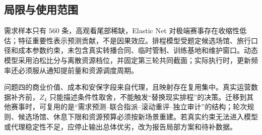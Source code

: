 \subsection{局限与使用范围}

需求样本只有 $560$ 条，高观看尾部稀缺，Elastic Net 对极端赛事存在收缩性低估；特征重要性表示预测贡献，不是因果效应。排程模型受题定候选场馆、旅行口径和成本参数约束，未包含真实转播合同、临时管制、训练基地和维护窗口。动态模型采用泊松比分与离散资源档位，并固定第三轮共同截面；实际执行时，更新频率还必须服从通知提前量和资源调度周期。

问题四的商业价值、成本和安保字段来自代理，且映射存在复用集中。真实运营数据补齐前，$Z_4$ 只能描述条件性取舍，不能触发“替换现实排程”的决策。迁移到其他赛事时，可复用的是“需求预测--联合指派--滚动重评--独立审计”的结构；轮次规则、候选场馆、休息下限和资源预算必须按新场景重建。若真实约束无法进入模型或代理稳定性不足，应停止输出总体优劣，改为报告局部方案和待补数据。
